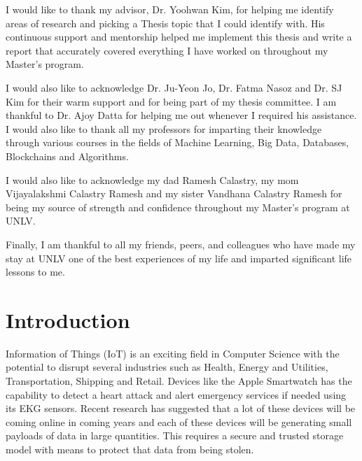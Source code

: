 \documentclass[11pt,openright]{report}
\begin{document}
\begin{thesisacknowledgments}
I would like to thank my advisor, Dr. Yoohwan Kim, for helping me identify areas of research and picking a Thesis topic that I could identify with. His continuous support and mentorship helped me implement this thesis and write a report that accurately covered everything I have worked on throughout my Master's program.

I would also like to acknowledge  Dr. Ju-Yeon Jo, Dr. Fatma Nasoz and Dr. SJ Kim for their warm support and for being part of my thesis committee. I am thankful to Dr. Ajoy Datta for helping me out whenever I required his assistance. I would also like to thank all my professors for imparting their knowledge through various courses in the fields of Machine Learning, Big Data, Databases, Blockchains and Algorithms.

I would also like to acknowledge my dad Ramesh Calastry, my mom Vijayalakshmi Calastry Ramesh and my sister Vandhana Calastry Ramesh for being my source of strength and confidence throughout my Master's program at UNLV.

Finally, I am thankful to all my friends, peers, and colleagues who have made my stay at UNLV one of the best experiences of my life and imparted significant life lessons to me. 
\end{thesisacknowledgments}

\pagestyle{plain}

\tableofcontents
\clearpage
\listoftables
\clearpage
\listoffigures
\clearpage
\listofalgorithms
\clearpage

\chapter{Introduction}\label{chapter:introduction} 

Information of Things (IoT) is an exciting field in Computer Science with the potential to disrupt several industries such as Health, Energy and Utilities, Transportation, Shipping and Retail. Devices like the Apple Smartwatch has the capability to detect a heart attack and alert emergency services if needed using its EKG sensors. Recent research has suggested that a lot of these devices will be coming online in coming years and each of these devices will be generating small payloads of data in large quantities. This requires a secure and trusted storage model with means to protect that data from being stolen. 
\end{document}
